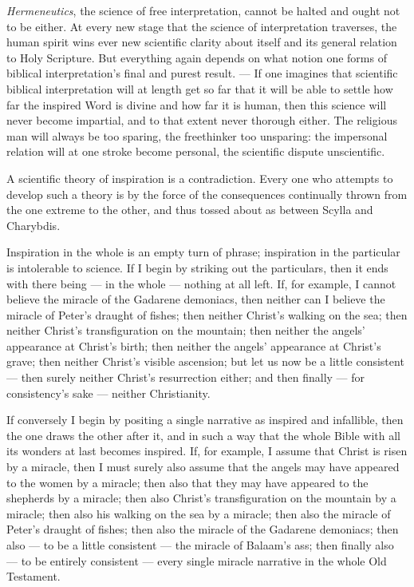 \documentclass[12pt,a4paper]{book}
\begin{document}
\emph{Hermeneutics}, the science of free interpretation, cannot be halted and ought not to be either.
At every new stage that the science of interpretation traverses, the human spirit wins ever new
scientific clarity about itself and its general relation to Holy Scripture. But everything again
depends on what notion one forms of biblical interpretation's final and purest result. --- If one
imagines that scientific biblical interpretation will at length get so far that it will be able to
settle how far the inspired Word is divine and how far it is human, then this science will never
become impartial, and to that extent never thorough either. The religious man will always be too
sparing, the freethinker too unsparing: the impersonal relation will at one stroke become personal,
the scientific dispute unscientific.

A scientific theory of inspiration is a contradiction. Every%
one who attempts to develop such a theory is by the force of the consequences continually thrown from
the one extreme to the other, and thus tossed about as between Scylla and Charybdis.

Inspiration in the whole is an empty turn of phrase; inspiration in the particular is intolerable to
science. If I begin by striking out the particulars, then it ends with there being --- in the whole
--- nothing at all left. If, for example, I cannot believe the miracle of the Gadarene demoniacs,
then neither can I believe the miracle of Peter's draught of fishes; then neither Christ's walking on
the sea; then neither Christ's transfiguration on the mountain; then neither the angels' appearance
at Christ's birth; then neither the angels' appearance at Christ's grave; then neither Christ's
visible ascension; but let us now be a little consistent --- then surely neither Christ's resurrection
either; and then finally --- for consistency's sake --- neither Christianity.

If conversely I begin by positing a single narrative as inspired and infallible, then the one draws
the other after it, and in such a way that the whole Bible with all its wonders at last becomes
inspired. If, for example, I assume that Christ is risen by a miracle, then I must surely also assume
that the angels may have appeared to the women by a miracle; then also that they may have appeared to
the shepherds by a miracle; then also Christ's transfiguration on the mountain by a miracle; then
also his walking on the sea by a miracle; then also the miracle of Peter's draught of fishes; then
also the miracle of the Gadarene demoniacs; then also --- to be a little consistent --- the miracle
of Balaam's ass; then finally also --- to be entirely consistent --- every single miracle narrative
in the whole Old Testament.
\end{document}
